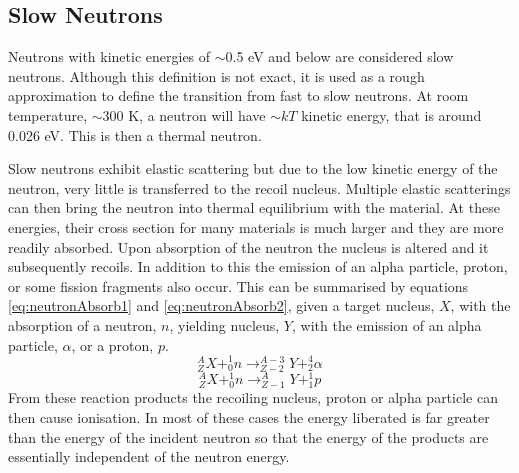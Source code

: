 \subsection{Slow Neutrons}
Neutrons with kinetic energies of $\sim$0.5 eV and below are considered slow neutrons. Although this definition is not exact, it is used as a rough approximation to define the transition from fast to slow neutrons. At room temperature, $\sim$300 K, a neutron will have $\sim$$kT$ kinetic energy, that is around 0.026 eV. This is then a thermal neutron. 

Slow neutrons exhibit elastic scattering but due to the low kinetic energy of the neutron, very little is transferred to the recoil nucleus. Multiple elastic scatterings can then bring the neutron into thermal equilibrium with the material. At these energies, their cross section for many materials is much larger and they are more readily absorbed. Upon absorption of the neutron the nucleus is altered and it subsequently recoils. In addition to this the emission of an alpha particle, proton, or some fission fragments also occur. This can be summarised by equations \ref{eq:neutronAbsorb1} and \ref{eq:neutronAbsorb2}, given a target nucleus, $X$, with the absorption of a neutron, $n$, yielding nucleus, $Y$, with the emission of an alpha particle, $\alpha$, or a proton, $p$.  
\begin{equation}
	^{A}_{Z}X + ^{1}_{0}n \rightarrow ^{A-3}_{Z-2}Y + ^{4}_{2}\alpha
	\label{eq:neutronAbsorb1}
\end{equation}
\vspace{-10mm}
\begin{equation}
	^{A}_{Z}X + ^{1}_{0}n \rightarrow ^{A}_{Z-1}Y + ^{1}_{1}p
	\label{eq:neutronAbsorb2}
\end{equation}
From these reaction products the recoiling nucleus, proton or alpha particle can then cause ionisation. In most of these cases the energy liberated is far greater than the energy of the incident neutron so that the energy of the products are essentially independent of the neutron energy. 

